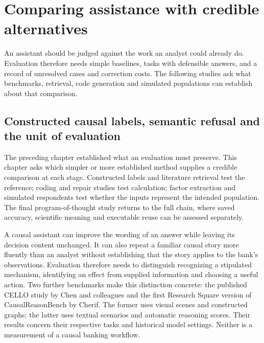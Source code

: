 \chapter{Comparing assistance with credible alternatives}
An assistant should be judged against the work an analyst could already
do. Evaluation therefore needs simple baselines, tasks with defensible answers,
and a record of unresolved cases and correction costs. The following studies
ask what benchmarks, retrieval, code generation and simulated populations can
establish about that comparison.



\section{Constructed causal labels, semantic refusal and the unit of evaluation}
\label{exec17:benchmark-development}

The preceding chapter established what an evaluation must preserve. This chapter asks which simpler or more established method supplies a credible comparison at each stage. Constructed labels and literature retrieval test the reference; coding and repair studies test calculation; factor extraction and simulated respondents test whether the inputs represent the intended population. The final program-of-thought study returns to the full chain, where saved accuracy, scientific meaning and executable reuse can be assessed separately.

A causal assistant can improve the wording of an answer while leaving its
decision content unchanged. It can also repeat a familiar causal story more
fluently than an analyst without establishing that the story applies to the
bank's observations. Evaluation therefore needs to distinguish recognizing a
stipulated mechanism, identifying an effect from supplied information and
choosing a useful action. Two further benchmarks make this distinction
concrete: the published CELLO study by Chen and colleagues and the first
Research Square version of CausalReasonBench by Cherif. The former uses visual
scenes and constructed graphs; the latter uses textual scenarios and automatic
reasoning scores. Their results concern their respective tasks and historical
model settings. Neither is a measurement of a causal banking
workflow.~\citep{exec17_benchmark_cello,exec17_benchmark_cherif}

